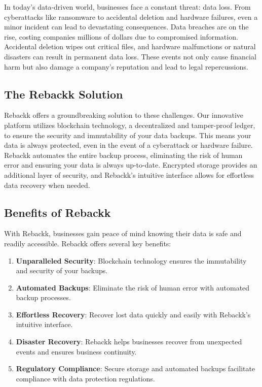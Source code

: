 \documentclass[12pt]{article}
\begin{document}
In today's data-driven world, businesses face a constant threat: data loss. From cyberattacks like ransomware to accidental deletion and hardware failures, even a minor incident can lead to devastating consequences. Data breaches are on the rise, costing companies millions of dollars due to compromised information. Accidental deletion wipes out critical files, and hardware malfunctions or natural disasters can result in permanent data loss. These events not only cause financial harm but also damage a company's reputation and lead to legal repercussions.

\subsection{The Rebackk Solution}

Rebackk offers a groundbreaking solution to these challenges. Our innovative platform utilizes blockchain technology, a decentralized and tamper-proof ledger, to ensure the security and immutability of your data backups. This means your data is always protected, even in the event of a cyberattack or hardware failure. Rebackk automates the entire backup process, eliminating the risk of human error and ensuring your data is always up-to-date. Encrypted storage provides an additional layer of security, and Rebackk's intuitive interface allows for effortless data recovery when needed.

\subsection{Benefits of Rebackk}

With Rebackk, businesses gain peace of mind knowing their data is safe and readily accessible. Rebackk offers several key benefits:

\begin{enumerate}
    \item \textbf{Unparalleled Security}: Blockchain technology ensures the immutability and security of your backups.
    \item \textbf{Automated Backups}: Eliminate the risk of human error with automated backup processes.
    \item \textbf{Effortless Recovery}: Recover lost data quickly and easily with Rebackk's intuitive interface.
    \item \textbf{Disaster Recovery}: Rebackk helps businesses recover from unexpected events and ensures business continuity.
    \item \textbf{Regulatory Compliance}: Secure storage and automated backups facilitate compliance with data protection regulations.
\end{enumerate}
\end{document}
